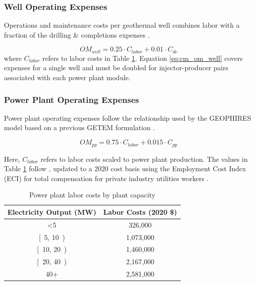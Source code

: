 \subsubsection{Well Operating Expenses}\label{ch4:cm_opex_well}
Operations and maintenance costs per geothermal well combines labor with a fraction of the drilling \& completions expenses \citep[Equation 12,\ ][]{beckers_introducing_2013}.

\begin{equation}
\label{eq:cm_om_well}
    OM_{well} = 0.25 \cdot C_{labor} + 0.01 \cdot C_{dc}
\end{equation}
where $C_{labor}$ refers to labor costs in Table \ref{tab:labor_costs}. Equation \ref{eq:cm_om_well} covers expenses for a single well and must be doubled for injector-producer pairs associated with each power plant module.

\subsubsection{Power Plant Operating Expenses}\label{ch4:cm_opex_pp}
Power plant operating expenses follow the relationship used by the GEOPHIRES model based on a previous GETEM formulation \citep[Equation 9,\ ][]{beckers_introducing_2013}.

\begin{equation}
\label{eq:cm_om_pp}
    OM_{pp} = 0.75 \cdot C_{labor} + 0.015 \cdot C_{pp}
\end{equation}

Here, $C_{labor}$ refers to labor costs scaled to power plant production. The values in Table \ref{tab:labor_costs} follow \citet[Equation 10,\ ][]{beckers_introducing_2013}, updated to a 2020 cost basis using the Employment Cost Index (ECI) for total compensation for private industry utilities workers \citep{us_bls_eci_2021}.

\begin{table}[!htp]
\centering
\begin{tabular}{|c|c|}
\hline
\textbf{Electricity Output (MW)} & \textbf{Labor Costs (2020 \$)} \\ \hline
\textless 5 & 326,000 \\ \hline
{[}\ 5, 10\ ) & 1,073,000 \\ \hline
{[}\ 10, 20\ ) & 1,460,000 \\ \hline
{[}\ 20, 40\ ) & 2,167,000 \\ \hline
40+ & 2,581,000 \\ \hline
\end{tabular}
\caption[Power plant labor costs]{Power plant labor costs by plant capacity  \protect\citep{beckers_introducing_2013}}
\label{tab:labor_costs}
\end{table}

